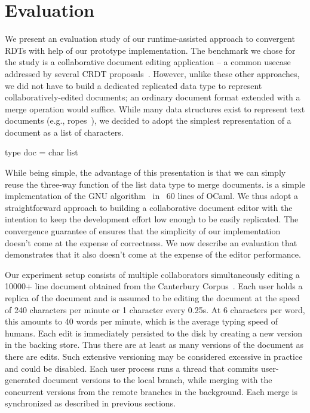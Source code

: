 \section{Evaluation}
\label{sec:eval}

We present an evaluation study of our runtime-assisted approach to
convergent RDTs with help of our prototype \quark implementation. The
benchmark we chose for the study is a collaborative document editing
application -- a common usecase addressed by several CRDT
proposals~\cite{rga, treedoc, crdts}. However, unlike these
other approaches, we did not have to build a dedicated replicated data
type to represent collaboratively-edited documents; an ordinary
document format extended with a merge operation would suffice. While
many data structures exist to represent text documents (e.g.,
ropes~\cite{boehm95}), we decided to adopt the simplest representation
of a document as a list of characters. 
\begin{center}
\begin{ocaml}
        type doc = char list
\end{ocaml}
\end{center}
While being simple, the advantage of this presentation is that we can
simply reuse the three-way  function of the list data
type to merge documents.  is a simple implementation of
the GNU  algorithm~\cite{gnudiff} in ~60 lines of OCaml. We
thus adopt a straightforward approach to building a collaborative
document editor with the intention to keep the development effort low
enough to be easily replicated. The convergence guarantee of \quark
ensures that the simplicity of our implementation doesn't come at the
expense of correctness. We now describe an evaluation that
demonstrates that it also doesn't come at the expense of the editor
performance.

Our experiment setup consists of multiple collaborators simultaneously
editing a 10000+ line document obtained from the Canterbury
Corpus~\cite{canterbury}. Each user holds a replica of the document
and is assumed to be editing the document at the speed of 240
characters per minute or 1 character every 0.25s. At 6 characters per
word, this amounts to 40 words per minute, which is the average typing
speed of humans. Each edit is immediately persisted to the disk by
creating a new version in the backing store. Thus there are at least
as many versions of the document as there are edits. Such extensive
versioning may be considered excessive in practice and could be
disabled. Each user process runs a \quark thread that commits
user-generated document versions to the local branch, while
merging with the concurrent versions from the remote branches in the
background. Each merge is synchronized as described in previous
sections.

